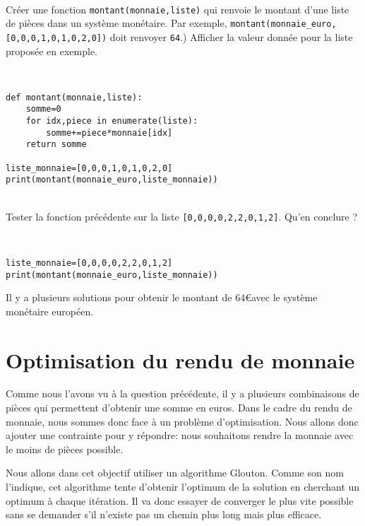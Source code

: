 \begin{exercice}~\\
Créer une fonction \verb?montant(monnaie,liste)? qui renvoie le montant d'une liste de pièces dans un système monétaire. Par exemple, \verb?montant(monnaie_euro,[0,0,0,1,0,1,0,2,0])? doit renvoyer \verb?64?.) Afficher la valeur donnée pour la liste proposée en exemple.
\end{exercice}

\begin{solution}~\ \\
\begin{verbatim}
def montant(monnaie,liste):
    somme=0
    for idx,piece in enumerate(liste):
        somme+=piece*monnaie[idx]
    return somme
    
liste_monnaie=[0,0,0,1,0,1,0,2,0]
print(montant(monnaie_euro,liste_monnaie))
\end{verbatim}
\end{solution}

\begin{exercice}~\\
Tester la fonction précédente sur la liste \verb?[0,0,0,0,2,2,0,1,2]?. Qu'en conclure ?
\end{exercice}

\begin{solution}~\ \\
\begin{verbatim}
liste_monnaie=[0,0,0,0,2,2,0,1,2]
print(montant(monnaie_euro,liste_monnaie))
\end{verbatim}

Il y a plusieurs solutions pour obtenir le montant de 64\euro avec le système monétaire européen.
\end{solution}

\section{Optimisation du rendu de monnaie}

Comme nous l'avons vu à la question précédente, il y a plusieurs combinaisons de pièces qui permettent d'obtenir une somme en euros. Dans le cadre du rendu de monnaie, nous sommes donc face à un problème d'optimisation. Nous allons donc ajouter une contrainte pour y répondre: nous souhaitons rendre la monnaie avec le moins de pièces possible.

Nous allons dans cet objectif utiliser un algorithme Glouton. Comme son nom l'indique, cet algorithme tente d'obtenir l'optimum de la solution en cherchant un optimum à chaque itération. Il va donc essayer de converger le plus vite possible sans se demander s'il n'existe pas un chemin plus long mais plus efficace.

